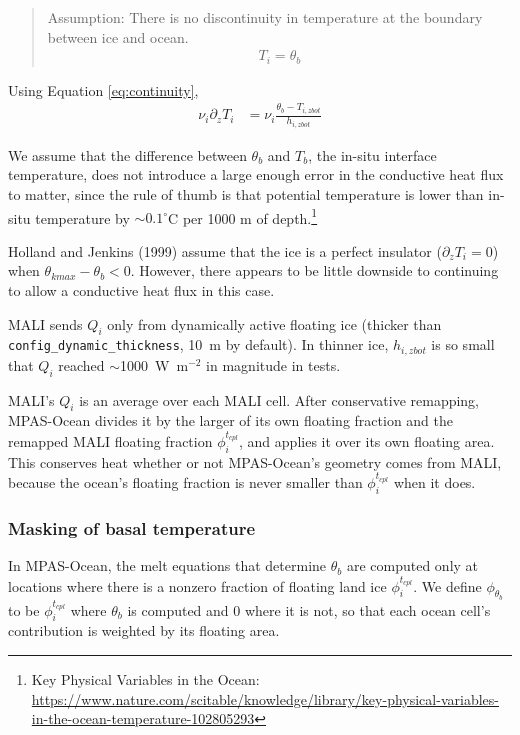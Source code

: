 \documentclass[11pt]{report}
\newcommand{\bea}{\begin{eqnarray}}
\newcommand{\eea}{\end{eqnarray}}
\begin{document}
\begin{quote}
    Assumption: There is no discontinuity in temperature at the boundary between ice and ocean.
    \bea
        T_i = \theta_b \label{eq:continuity}
    \eea
\end{quote}

Using Equation \ref{eq:continuity},
\bea
    \nu_i \partial_z T_i &=\nu_i \frac{\theta_b - T_{i,zbot}}{h_{i,zbot}}\label{eq:conduct}
\eea

We assume that the difference between $\theta_b$ and $T_b$, the in-situ interface temperature, does not introduce a large enough error in the conductive heat flux to matter, since the rule of thumb is that potential temperature is lower than in-situ temperature by $\sim 0.1^\circ$C per 1000 m of depth.\footnote{Key Physical Variables in the Ocean: \url{https://www.nature.com/scitable/knowledge/library/key-physical-variables-in-the-ocean-temperature-102805293}}

Holland and Jenkins (1999) assume that the ice is a perfect insulator ($\partial_z T_i = 0$) when $\theta_{kmax} - \theta_b < 0$. However, there appears to be little downside to continuing to allow a conductive heat flux in this case.

MALI sends $Q_i$ only from dynamically active floating ice (thicker than \texttt{config\_dynamic\_thickness}, 10~m by default).  In thinner ice, $h_{i,zbot}$ is so small that $Q_i$ reached $\sim$1000~W~m$^{-2}$ in magnitude in tests.

MALI's $Q_i$ is an average over each MALI cell.  After conservative remapping, MPAS-Ocean divides it by the larger of its own floating fraction and the remapped MALI floating fraction $\phi_i^{t_{cpl}}$, and applies it over its own floating area.  This conserves heat whether or not MPAS-Ocean's geometry comes from MALI, because the ocean's floating fraction is never smaller than $\phi_i^{t_{cpl}}$ when it does.

\subsubsection{Masking of basal temperature}

In MPAS-Ocean, the melt equations that determine $\theta_b$ are computed only at locations where there is a nonzero fraction of floating land ice $\phi_i^{t_{cpl}}$.  We define $\phi_{\theta_b}$ to be $\phi_i^{t_{cpl}}$ where $\theta_b$ is computed and 0 where it is not, so that each ocean cell's contribution is weighted by its floating area.
\end{document}
